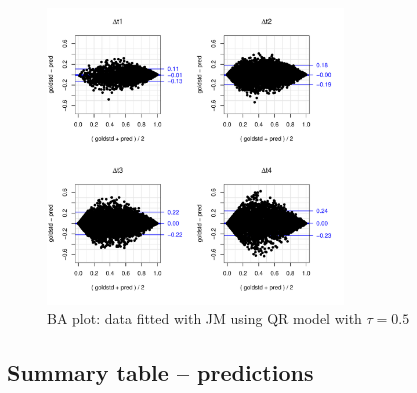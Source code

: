 \documentclass{article}
\begin{document}
\begin{figure}[H]
\centering
\includegraphics[width=0.7\textwidth]{normdata_qt50pred_more.pdf}
\caption{BA plot: data fitted with JM using QR model with $\tau=0.5$}
\end{figure}



\subsection{Summary table -- predictions}
\end{document}
